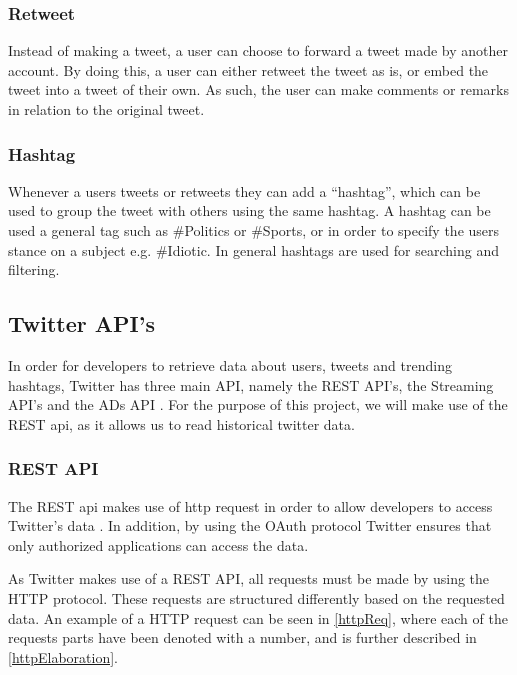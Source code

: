 \subsubsection{Retweet}
Instead of making a tweet, a user can choose to forward a tweet made by another
account. By doing this, a user can either retweet the tweet as is, or embed the
tweet into a tweet of their own. As such, the user can make comments or remarks
in relation to the original tweet.

\subsubsection{Hashtag}
Whenever a users tweets or retweets they can add a ``hashtag'', which can be
used to group the tweet with others using the same hashtag. A hashtag can be
used a general tag such as \#Politics or \#Sports, or in order to specify the
users stance on a subject e.g. \#Idiotic. In general hashtags are used for
searching and filtering.

\subsection{Twitter API's}
In order for developers to retrieve data about users, tweets and trending
hashtags, Twitter has three main API, namely the REST API's, the Streaming API's
and the ADs API \citep{TwitterDevDocs}. For the purpose of this project,
we will make use of the REST api, as it allows us to read historical twitter
data.

\subsubsection{REST API}
The REST api makes use of http request in order to allow developers to access
Twitter's data \citep{TwitterREST}. In addition, by using the OAuth protocol
\citep{TwitterOAuth} Twitter ensures that only authorized applications can
access the data.\nl

As Twitter makes use of a REST API, all requests must be made by using the HTTP
protocol. These requests are structured differently based on the requested
data. An example of a HTTP request can be seen in \autoref{httpReq}, where each
of the requests parts have been denoted with a number, and is further described
in \autoref{httpElaboration}.


